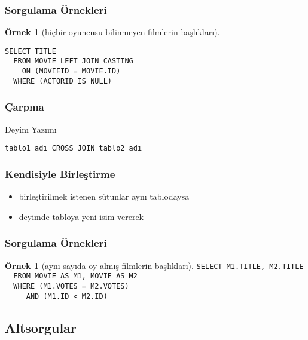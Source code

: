 \documentclass[dvipsnames]{beamer}
\theoremstyle{definition}
\theoremstyle{example}
\newtheorem{ornek}[theorem]{Örnek}
\theoremstyle{plain}
\begin{document}
\begin{frame}[fragile]
  \frametitle{Sorgulama Örnekleri}

  \begin{ornek}[hiçbir oyuncusu bilinmeyen filmlerin başlıkları]
    \begin{lstlisting}
SELECT TITLE
  FROM MOVIE LEFT JOIN CASTING
    ON (MOVIEID = MOVIE.ID)
  WHERE (ACTORID IS NULL)
    \end{lstlisting}
  \end{ornek}
\end{frame}

\begin{frame}[fragile]
  \frametitle{Çarpma}

  \begin{block}{Deyim Yazımı}
    \begin{lstlisting}
tablo1_adı CROSS JOIN tablo2_adı
    \end{lstlisting}
  \end{block}
\end{frame}

\begin{frame}[fragile]
  \frametitle{Kendisiyle Birleştirme}

  \begin{itemize}
    \item birleştirilmek istenen sütunlar aynı tablodaysa
    \item deyimde tabloya yeni isim vererek
  \end{itemize}
\end{frame}

\begin{frame}[fragile]
  \frametitle{Sorgulama Örnekleri}

  \begin{ornek}[aynı sayıda oy almış filmlerin başlıkları]
    \lstinline!SELECT M1.TITLE, M2.TITLE!\\
    \lstinline!  FROM MOVIE AS M1, MOVIE AS M2!\\
    \lstinline!  WHERE (M1.VOTES = M2.VOTES)!\\
    \pause
    \lstinline!     AND (M1.ID < M2.ID)!
  \end{ornek}
\end{frame}

\subsection{Altsorgular}
\end{document}
